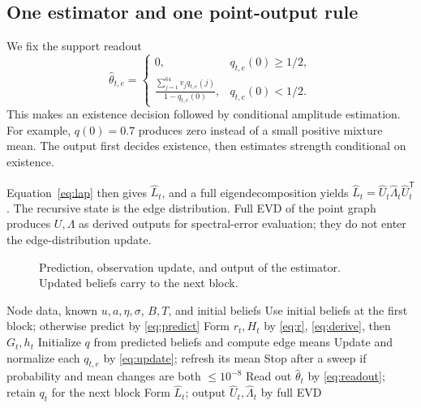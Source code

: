 \documentclass[journal]{IEEEtran}
\newcommand{\T}{\mathsf T}
\begin{document}
\subsection{One estimator and one point-output rule}
We fix the support readout
\begin{equation}
\hat\theta_{t,e}=\begin{cases}
0,&q_{t,e}(0)\geq1/2,\\
\displaystyle\frac{\sum_{j=1}^{64}v_jq_{t,e}(j)}{1-q_{t,e}(0)},&q_{t,e}(0)<1/2.
\end{cases}\label{eq:readout}
\end{equation}
This makes an existence decision followed by conditional amplitude estimation. For example, $q(0)=0.7$ produces zero instead of a small positive mixture mean. The output first decides existence, then estimates strength conditional on existence.

Equation~\eqref{eq:lap} then gives $\hat L_t$, and a full eigendecomposition yields $\hat L_t=\hat U_t\hat\Lambda_t\hat U_t^\T$. The recursive state is the edge distribution. Full EVD of the point graph produces $U,\Lambda$ as derived outputs for spectral-error evaluation; they do not enter the edge-distribution update.
\begin{figure}[t]
\centering
{}
\caption{Prediction, observation update, and output of the estimator. Updated beliefs carry to the next block.}\label{fig:flow}
\end{figure}

\begin{algorithm}[t]
\caption{Recursive edge estimation from node signals}\label{alg:main}
\begin{algorithmic}[1]\footnotesize
\Require Node data, known $u,a,\eta,\sigma$, $B,T$, and initial beliefs
\State Use initial beliefs at the first block; otherwise predict by \eqref{eq:predict}
\State Form $r_t,H_t$ by \eqref{eq:r}, \eqref{eq:derive}, then $G_t,h_t$
\State Initialize $q$ from predicted beliefs and compute edge means
\State Update and normalize each $q_{t,e}$ by \eqref{eq:update}; refresh its mean
\State Stop after a sweep if probability and mean changes are both $\leq10^{-8}$
\EndFor
\State Read out $\hat\theta_t$ by \eqref{eq:readout}; retain $q_t$ for the next block
\State Form $\hat L_t$; output $\hat U_t,\hat\Lambda_t$ by full EVD
\EndFor
\end{algorithmic}\end{algorithm}
\end{document}
